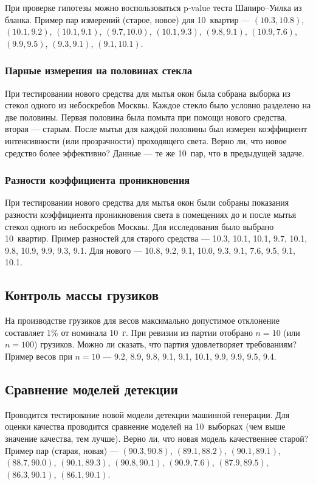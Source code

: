 При проверке гипотезы можно воспользоваться p-value теста Шапиро--Уилка из бланка. Пример пар измерений (старое, новое) для 10~квартир --- $(10.3, 10.8)$, $(10.1, 9.2)$, $(10.1, 9.1)$, $(9.7, 10.0)$, $(10.1, 9.3)$, $(9.8, 9.1)$, $(10.9, 7.6)$, $(9.9, 9.5)$, $(9.3, 9.1)$, $(9.1, 10.1)$.

\subsubsection{Парные измерения на половинах стекла}

При тестировании нового средства для мытья окон была собрана выборка из стекол одного из небоскребов Москвы. Каждое стекло было условно разделено на две половины. Первая половина была помыта при помощи нового средства, вторая --- старым. После мытья для каждой половины был измерен коэффициент интенсивности (или прозрачности) проходящего света. Верно ли, что новое средство более эффективно? Данные --- те же 10~пар, что в предыдущей задаче.

\subsubsection{Разности коэффициента проникновения}

При тестировании нового средства для мытья окон были собраны показания разности коэффициента проникновения света в помещениях до и после мытья стекол одного из небоскребов Москвы. Для исследования было выбрано 10~квартир. Пример разностей для старого средства --- 10.3, 10.1, 10.1, 9.7, 10.1, 9.8, 10.9, 9.9, 9.3, 9.1. Для нового --- 10.8, 9.2, 9.1, 10.0, 9.3, 9.1, 7.6, 9.5, 9.1, 10.1.

\subsection{Контроль массы грузиков}

На производстве грузиков для весов максимально допустимое отклонение составляет 1\% от номинала 10~г. При ревизии из партии отобрано $n=10$ (или $n=100$) грузиков. Можно ли сказать, что партия удовлетворяет требованиям? Пример весов при $n=10$ --- 9.2, 8.9, 9.8, 9.1, 9.1, 10.1, 9.9, 9.9, 9.5, 9.4.

\subsection{Сравнение моделей детекции}

Проводится тестирование новой модели детекции машинной генерации. Для оценки качества проводится сравнение моделей на 10~выборках (чем выше значение качества, тем лучше). Верно ли, что новая модель качественнее старой? Пример пар (старая, новая) --- $(90.3, 90.8)$, $(89.1, 88.2)$, $(90.1, 89.1)$, $(88.7, 90.0)$, $(90.1, 89.3)$, $(90.8, 90.1)$, $(90.9, 7.6)$, $(87.9, 89.5)$, $(86.3, 90.1)$, $(86.1, 90.1)$.

